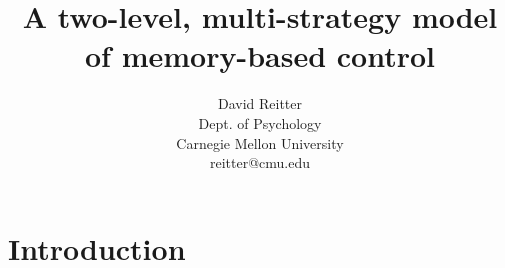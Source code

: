\documentclass[twocolumn]{article}
\title{A two-level, multi-strategy model of memory-based control}
\author{David Reitter \\ Dept. of Psychology \\ Carnegie Mellon University \\ reitter@cmu.edu}
\begin{document}
\maketitle

















\section{Introduction}
\end{document}
